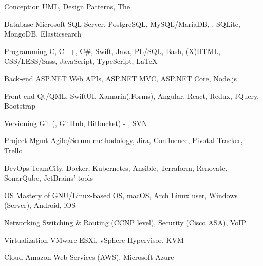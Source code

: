 

\begin{cvskills}

  \cvskill
    {Conception} %
    {UML, Design Patterns, The } %

  \cvskill
    {Database} %
    {Microsoft SQL Server, PostgreSQL, MySQL/MariaDB, , SQLite, MongoDB, Elasticsearch} %

  \cvskill
    {Programming} %
    {C, C++, C\#, Swift, Java, PL/SQL, Bash, (X)HTML, CSS/LESS/Sass, JavaScript, TypeScript, \LaTeX} %

  \cvskill
    {Back-end} %
    {ASP.NET Web APIs, ASP.NET MVC, ASP.NET Core, Node.js} %

  \cvskill
    {Front-end} %
    {Qt/QML, SwiftUI, Xamarin(.Forms), Angular, React, Redux, JQuery, Bootstrap} %

  \cvskill
    {Versioning} %
    {Git (, GitHub, Bitbucket) - , SVN} %

  \cvskill
    {Project Mgmt} %
    {Agile/Scrum methodology, Jira, Confluence, Pivotal Tracker, Trello} %

  \cvskill
    {DevOps} %
    {TeamCity, Docker, Kubernetes, Ansible, Terraform, Renovate, SonarQube, JetBrains’ tools} %

  \cvskill
    {OS} %
    {Mastery of GNU/Linux-based OS, macOS, Arch Linux user, Windows (Server), Android, iOS} %

  \cvskill
    {Networking} %
    {Switching \& Routing (CCNP level), Security (Cisco ASA), VoIP} %

  \cvskill
    {Virtualization} %
    {VMware ESXi, vSphere Hypervisor, KVM} %

  \cvskill
    {Cloud} %
    {Amazon Web Services (AWS), Microsoft Azure} %


\end{cvskills}

